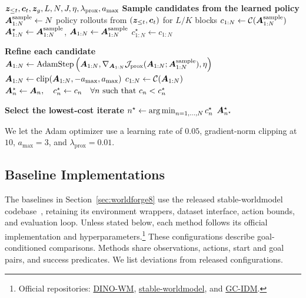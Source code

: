 \documentclass{article} %
\newcommand{\methodname}[1]{\textup{#1}}
\begin{document}
\begin{algorithm}[H]
\caption{Candidate refinement and selection for LeWAM planning}
\label{alg:lewam-gradient-planning}
\begin{algorithmic}[1]
\Require ${\bm{z}}_{\leq t},{\bm{c}}_t,{\bm{z}}_g,L,N,J,\eta,\lambda_{\mathrm{prox}},a_{\max}$
\Statex \textbf{Sample candidates from the learned policy}
\State ${\bm{A}}_{1:N}^{\mathrm{sample}} \gets N$ policy rollouts from $({\bm{z}}_{\leq t},{\bm{c}}_t)$ for $L/K$ blocks
\State $c_{1:N} \gets {\mathcal{C}}({\bm{A}}_{1:N}^{\mathrm{sample}})$
\State ${\bm{A}}^\star_{1:N} \gets {\bm{A}}_{1:N}^{\mathrm{sample}}$, \quad ${\bm{A}}_{1:N} \gets {\bm{A}}_{1:N}^{\mathrm{sample}}$
\State $c^\star_{1:N} \gets c_{1:N}$

\Statex \textbf{Refine each candidate}
    \State ${\bm{A}}_{1:N} \gets
    \operatorname{AdamStep}\left(
    {\bm{A}}_{1:N},
    \nabla_{{\bm{A}}_{1:N}}{\mathcal{J}}_{\mathrm{prox}}
    ({\bm{A}}_{1:N};{\bm{A}}_{1:N}^{\mathrm{sample}}),
    \eta\right)$
    \State ${\bm{A}}_{1:N} \gets
    \operatorname{clip}({\bm{A}}_{1:N},-a_{\max},a_{\max})$
    \State $c_{1:N} \gets {\mathcal{C}}({\bm{A}}_{1:N})$
    \State ${\bm{A}}^\star_n \gets {\bm{A}}_n,\quad
    c_n^\star \gets c_n
    \quad \forall n\text{ such that }c_n<c_n^\star$
\EndFor

\Statex \textbf{Select the lowest-cost iterate}
\State $n^\star \gets \operatorname*{arg\,min}_{n=1,\ldots,N} c_n^\star$
\State \Return ${\bm{A}}^\star_{n^\star}$
\end{algorithmic}
\end{algorithm}

We let the Adam optimizer use a learning rate of $0.05$, gradient-norm
clipping at $10$, $a_{\max}=3$, and $\lambda_{\mathrm{prox}}=0.01$.

\subsection{Baseline Implementations}
\label{app:baseline-implementations}

The baselines in Section~\ref{sec:worldforge8} use the released \methodname{stable-worldmodel}
codebase~\citep{maes2026swm}, retaining its environment wrappers, dataset interface,
action bounds, and evaluation loop. Unless stated below, each method follows its official
implementation and hyperparameters.\footnote{Official repositories:
\href{https://github.com/gaoyuezhou/dino_wm}{DINO-WM},
\href{https://github.com/galilai-group/stable-worldmodel}{stable-worldmodel}, and
\href{https://github.com/hdnndh/Latent-Geometry-Beyond-Search-Amortizing-Planning-in-World-Models}{GC-IDM}.}
These configurations describe goal-conditioned comparisons. Methods share observations, actions,
start and goal pairs, and success predicates. We list deviations from released configurations.
\end{document}
